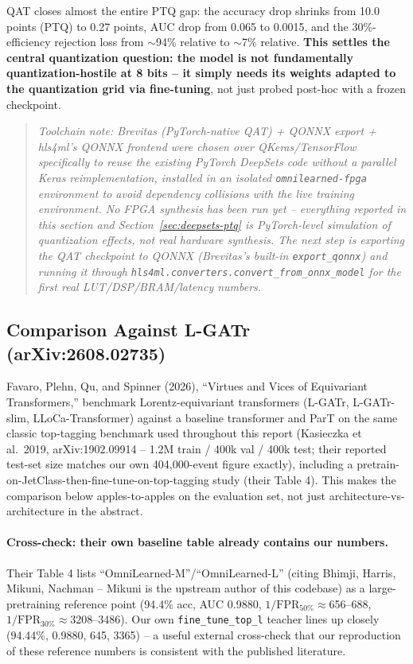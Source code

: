 QAT closes almost the entire PTQ gap: the accuracy drop shrinks from 10.0
points (PTQ) to 0.27 points, AUC drop from 0.065 to 0.0015, and the
30\%-efficiency rejection loss from $\sim$94\% relative to $\sim$7\%
relative. \textbf{This settles the central quantization question: the model
is not fundamentally quantization-hostile at 8 bits -- it simply needs its
weights adapted to the quantization grid via fine-tuning}, not just probed
post-hoc with a frozen checkpoint.

\begin{quote}
\emph{Toolchain note: Brevitas (PyTorch-native QAT) + QONNX export +
hls4ml's QONNX frontend were chosen over QKeras/TensorFlow specifically to
reuse the existing PyTorch DeepSets code without a parallel Keras
reimplementation, installed in an isolated \texttt{omnilearned-fpga}
environment to avoid dependency collisions with the live training
environment. No FPGA synthesis has been run yet -- everything reported in
this section and Section~\ref{sec:deepsets-ptq} is PyTorch-level simulation
of quantization effects, not real hardware synthesis. The next step is
exporting the QAT checkpoint to QONNX (Brevitas's built-in
\texttt{export\_qonnx}) and running it through
\texttt{hls4ml.converters.convert\_from\_onnx\_model} for the first real
LUT/DSP/BRAM/latency numbers.}
\end{quote}

\subsection{Comparison Against L-GATr (arXiv:2608.02735)}
\label{sec:lgatr-comparison}

Favaro, Plehn, Qu, and Spinner (2026), ``Virtues and Vices of Equivariant
Transformers,'' benchmark Lorentz-equivariant transformers (L-GATr,
L-GATr-slim, LLoCa-Transformer) against a baseline transformer and ParT on
the same classic top-tagging benchmark used throughout this report
(Kasieczka et al.\ 2019, arXiv:1902.09914 -- 1.2M train / 400k val / 400k
test; their reported test-set size matches our own 404{,}000-event figure
exactly), including a pretrain-on-JetClass-then-fine-tune-on-top-tagging
study (their Table 4). This makes the comparison below apples-to-apples on
the evaluation set, not just architecture-vs-architecture in the abstract.

\paragraph{Cross-check: their own baseline table already contains our
numbers.} Their Table 4 lists ``OmniLearned-M''/``OmniLearned-L'' (citing
Bhimji, Harris, Mikuni, Nachman -- Mikuni is the upstream author of this
codebase) as a large-pretraining reference point (94.4\% acc, AUC 0.9880,
$1/\mathrm{FPR}_{50\%}\approx$656--688, $1/\mathrm{FPR}_{30\%}\approx$3208--3486).
Our own \texttt{fine\_tune\_top\_l} teacher lines up closely (94.44\%,
0.9880, 645, 3365) -- a useful external cross-check that our reproduction of
these reference numbers is consistent with the published literature.

